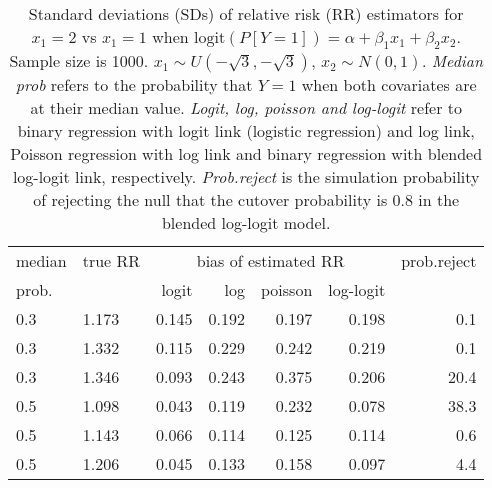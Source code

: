 \documentclass[12pt,a4paper]{article}
\begin{document}
\begin{table}[H] 
\small\sf\centering 
\caption{Standard deviations (SDs) of relative risk (RR) estimators for $x_1=2$ vs $x_1=1$ when $\mbox{logit}(P[Y=1])=\alpha+\beta_1 x_1 + \beta_2 x_2$. Sample size is 1000. $x_1 \sim $$U(-\sqrt{3},-\sqrt{3})$, $x_2 \sim N(0,1)$. {\it Median prob} refers to the probability that $Y=1$ when both covariates are at their median value. {\it Logit, log, poisson and log-logit} refer to binary regression with logit link (logistic regression) and log link, Poisson regression with log link and binary regression with blended log-logit link, respectively. {\it Prob.reject} is the simulation probability of rejecting the null that the cutover probability is $0.8$ in the blended log-logit model.} 
\begin{tabular}{llrrrrr} 
\toprule 
median & true RR & \multicolumn{4}{c}{bias of estimated RR} & prob.reject \\ 
prob. & & logit & log & poisson & log-logit  & \\ \midrule 
0.3 & 1.173 & 0.145 & 0.192 & 0.197 & 0.198 &  0.1 \\  
0.3 & 1.332 & 0.115 & 0.229 & 0.242 & 0.219 &  0.1 \\  
0.3 & 1.346 & 0.093 & 0.243 & 0.375 & 0.206 & 20.4 \\  
0.5 & 1.098 & 0.043 & 0.119 & 0.232 & 0.078 & 38.3 \\  
0.5 & 1.143 & 0.066 & 0.114 & 0.125 & 0.114 &  0.6 \\  
0.5 & 1.206 & 0.045 & 0.133 & 0.158 & 0.097 &  4.4 \\  
\bottomrule 
\end{tabular} 
\end{table} 
\end{document}
